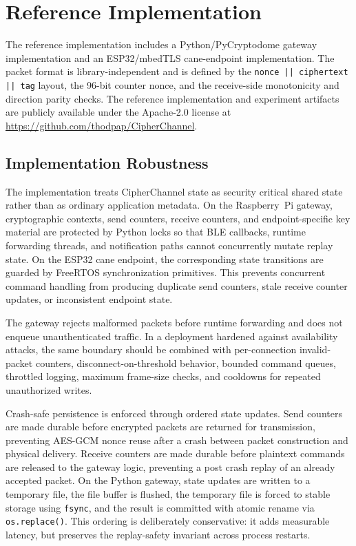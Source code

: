 \documentclass[journal]{IEEEtran}
\begin{document}
\section{Reference Implementation}
\label{sec:impl}

The reference implementation includes a Python/PyCryptodome gateway implementation and an ESP32/mbedTLS cane-endpoint implementation. The packet format is library-independent and is defined by the \texttt{nonce || ciphertext || tag} layout, the 96-bit counter nonce, and the receive-side monotonicity and direction parity checks. The reference implementation and experiment artifacts are publicly available under the Apache-2.0 license at \url{https://github.com/thodpap/CipherChannel}.

\subsection{Implementation Robustness}
\label{sec:impl-robustness}

The implementation treats CipherChannel state as security critical shared state rather than as ordinary application metadata. On the Raspberry~Pi gateway, cryptographic contexts, send counters, receive counters, and endpoint-specific key material are protected by Python locks so that BLE callbacks, runtime forwarding threads, and notification paths cannot concurrently mutate replay state. On the ESP32 cane endpoint, the corresponding state transitions are guarded by FreeRTOS synchronization primitives. This prevents concurrent command handling from producing duplicate send counters, stale receive counter updates, or inconsistent endpoint state.

The gateway rejects malformed packets before runtime forwarding and does not enqueue unauthenticated traffic. In a deployment hardened against availability attacks, the same boundary should be combined with per-connection invalid-packet counters, disconnect-on-threshold behavior, bounded command queues, throttled logging, maximum frame-size checks, and cooldowns for repeated unauthorized writes.

Crash-safe persistence is enforced through ordered state updates. Send counters are made durable before encrypted packets are returned for transmission, preventing AES-GCM nonce reuse after a crash between packet construction and physical delivery. Receive counters are made durable before plaintext commands are released to the gateway logic, preventing a post crash replay of an already accepted packet. On the Python gateway, state updates are written to a temporary file, the file buffer is flushed, the temporary file is forced to stable storage using \texttt{fsync}, and the result is committed with atomic rename via \texttt{os.replace()}. This ordering is deliberately conservative: it adds measurable latency, but preserves the replay-safety invariant across process restarts.
\end{document}
